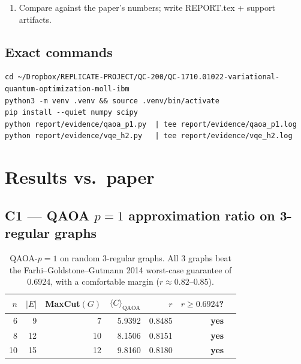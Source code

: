\documentclass[11pt]{article}
\begin{document}
\begin{enumerate}
\begin{enumerate}
      \item Add the nuclear-repulsion constant $E_{\mathrm{NR}} = 1/R$
            (a.u.) $= 0.7200$~Ha explicitly (subtle but essential: the
            tapered $H$ is electronic-only).
      \item Diagonalize the $4 \times 4$ $H$ analytically for the exact
            ground-state energy of \emph{this specific tapered Hamiltonian}.
      \item Implement the hardware-efficient ansatz: 2 entangler layers of
            RY-per-qubit + CZ, ending with a final RY layer, giving 6 real
            parameters.
      \item Minimize $\langle \psi(\vec\theta)|H|\psi(\vec\theta)\rangle$
            with COBYLA $\times 40$ restarts.
      \item Emit \texttt{vqe\_h2\_results.json}.
    \end{enumerate}
  \item Compare against the paper's numbers; write REPORT.tex + support artifacts.
\end{enumerate}

\subsection{Exact commands}
\begin{lstlisting}
cd ~/Dropbox/REPLICATE-PROJECT/QC-200/QC-1710.01022-variational-quantum-optimization-moll-ibm
python3 -m venv .venv && source .venv/bin/activate
pip install --quiet numpy scipy
python report/evidence/qaoa_p1.py  | tee report/evidence/qaoa_p1.log
python report/evidence/vqe_h2.py   | tee report/evidence/vqe_h2.log
\end{lstlisting}

\section{Results vs.\ paper}

\subsection{C1 --- QAOA $p{=}1$ approximation ratio on 3-regular graphs}
\begin{table}[h]
\centering
\begin{tabular}{r r r r r r l}
\toprule
$n$ & $|E|$ & MaxCut$(G)$ & $\langle C\rangle_{\mathrm{QAOA}}$ & $r$ & $r \ge 0.6924$? \\
\midrule
6  &  9 & 7  & 5.9392 & 0.8485 & \textbf{yes} \\
8  & 12 & 10 & 8.1506 & 0.8151 & \textbf{yes} \\
10 & 15 & 12 & 9.8160 & 0.8180 & \textbf{yes} \\
\bottomrule
\end{tabular}
\caption{QAOA-$p{=}1$ on random 3-regular graphs. All 3 graphs beat the
Farhi--Goldstone--Gutmann 2014 worst-case guarantee of $0.6924$, with a
comfortable margin ($r \approx 0.82$--$0.85$).}
\end{table}
\end{document}
